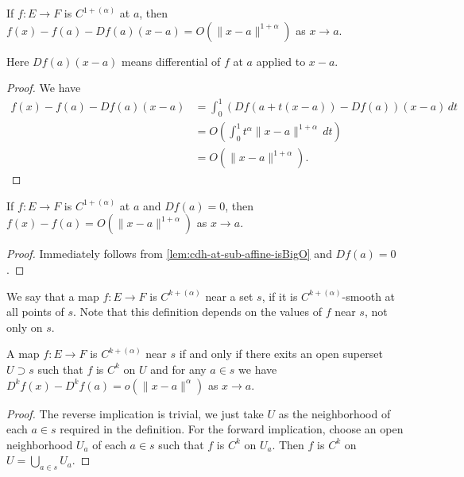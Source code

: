 \begin{lemma}%
  \label{lem:cdh-at-sub-affine-isBigO}
  If \(f\colon E \to F\) is \(C^{1+(\alpha)}\) at \(a\),
  then \(f(x) - f(a) - Df(a)(x - a) = O\left(\|x - a\|^{1 + \alpha}\right)\) as \(x \to a\).
\end{lemma}
Here \(Df(a)(x - a)\) means differential of \(f\) at \(a\) applied to \(x - a\).

\begin{proof}
  We have
  \begin{align*}
    f(x) - f(a) - Df(a)(x - a) &= \int_{0}^{1}\left(Df(a + t(x - a)) - Df(a)\right)(x - a)\,dt\\
                               &= O\left(\int_{0}^{1}t^{\alpha}\|x - a\|^{1+\alpha}\,dt\right)\\
                               &= O\left(\|x - a\|^{1 + \alpha}\right).
  \end{align*}
\end{proof}

\begin{corollary}%
  \label{cor:cdh-at-sub-isBigO}
  If \(f\colon E \to F\) is \(C^{1+(\alpha)}\) at \(a\) and \(Df(a) = 0\),
  then \(f(x) - f(a) = O\left(\|x - a\|^{1 + \alpha}\right)\) as \(x \to a\).
\end{corollary}

\begin{proof}
  Immediately follows from \autoref{lem:cdh-at-sub-affine-isBigO} and \(Df(a) = 0\).
\end{proof}

\begin{definition}%
  \label{def:cdh-near}
  We say that a map \(f\colon E\to F\) is \emph{\(C^{k+(\alpha)}\)} near a set \(s\),
  if it is \(C^{k+(\alpha)}\)-smooth at all points of \(s\).
  Note that this definition depends on the values of \(f\) near \(s\), not only on \(s\).
\end{definition}

\begin{lemma}%
  \label{lem:cdh-on-nhds-iff-open}
  A map \(f\colon E\to F\) is \(C^{k+(\alpha)}\) near \(s\)
  if and only if there exits an open superset \(U\supset s\)
  such that \(f\) is \(C^{k}\) on \(U\)
  and for any \(a \in s\) we have \(D^{k}f(x) - D^{k}f(a) = o(\|x - a\|^{\alpha})\) as \(x\to a\).
\end{lemma}

\begin{proof}
  The reverse implication is trivial, we just take \(U\) as the neighborhood of each \(a \in s\) required in the definition.
  For the forward implication, choose an open neighborhood \(U_{a}\) of each \(a \in s\) such that \(f\) is \(C^{k}\) on \(U_{a}\).
  Then \(f\) is \(C^{k}\) on \(U = \bigcup_{a \in s} U_{a}\).
\end{proof}

